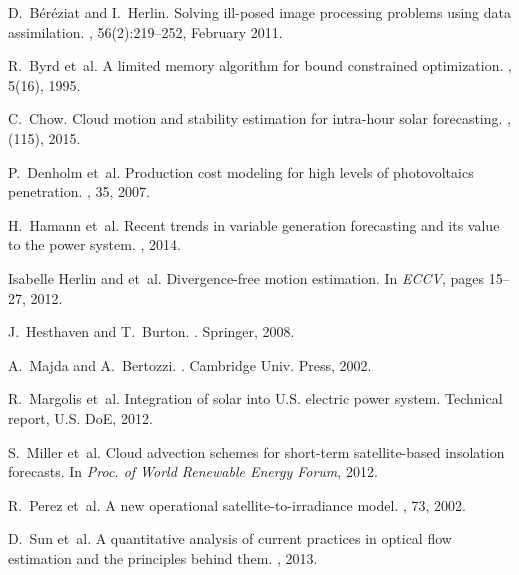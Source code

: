 \documentclass[onecolumn, 12pt, conference]{ieeeconf}
\begin{document}
%
\begin{thebibliography}{10}

D.~B\'er\'eziat and I.~Herlin.
\newblock Solving ill-posed image processing problems using data assimilation.
, 56(2):219--252, February 2011.

R.~Byrd et~al.
\newblock A limited memory algorithm for bound constrained optimization.
, 5(16), 1995.

C.~Chow.
\newblock Cloud motion and stability estimation for intra-hour solar
  forecasting.
, (115), 2015.

P.~Denholm et~al.
\newblock Production cost modeling for high levels of photovoltaics
  penetration.
, 35, 2007.

H.~Hamann et~al.
\newblock Recent trends in variable generation forecasting and its value to the
  power system.
, 2014.

Isabelle Herlin and et~al.
\newblock Divergence-free motion estimation.
\newblock In {\em ECCV}, pages 15--27, 2012.

J.~Hesthaven and T.~Burton.
.
\newblock Springer, 2008.

A.~Majda and A.~Bertozzi.
.
\newblock Cambridge Univ. Press, 2002.

R.~Margolis et~al.
\newblock Integration of solar into {U.S.} electric power system.
\newblock Technical report, U.S. DoE, 2012.

S.~Miller et~al.
\newblock Cloud advection schemes for short-term satellite-based insolation
  forecasts.
\newblock In {\em Proc. of World Renewable Energy Forum}, 2012.

R.~Perez et~al.
\newblock A new operational satellite-to-irradiance model.
, 73, 2002.

D.~Sun et~al.
\newblock A quantitative analysis of current practices in optical flow
  estimation and the principles behind them.
, 2013.


\end{thebibliography}
\end{document}
